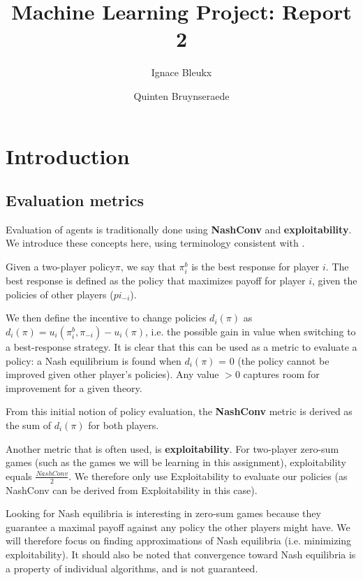 \documentclass[10pt,a4paper]{article}
\title{Machine Learning Project: Report 2}
\author{Ignace Bleukx \and Quinten Bruynseraede}
\begin{document}
\maketitle
\section{Introduction}
\subsection{Evaluation metrics}
Evaluation of agents is traditionally done using \textbf{NashConv} and \textbf{exploitability}. We introduce these concepts here, using terminology consistent with \citeauthor{lanctot2019openspiel} \citep{lanctot2019openspiel}.

Given a two-player policy$\pi$, we say that $\pi^{b}_{i}$ is the best response for player $i$. The best response is defined as the policy that maximizes payoff for player $i$, given the policies of other players ($pi_{-i}$). 

We then define the incentive to change policies $d_{i}(\pi)$ as $d_{i}(\pi) = u_{i}(\pi^{b}_{i},\pi_{-i}) - u_{i}(\pi)$, i.e. the possible gain in value when switching to a best-response strategy. It is clear that this can be used as a metric to evaluate a policy: a Nash equilibrium is found when $d_{i}(\pi)$ = 0 (the policy cannot be improved given other player's policies). Any value $>0$ captures room for improvement for a given theory. 

From this initial notion of policy evaluation, the \textbf{NashConv} metric is derived as the sum of $d_{i}(\pi)$ for both players.

Another metric that is often used, is \textbf{exploitability}. For two-player zero-sum games (such as the games we will be learning in this assignment), exploitability equals $\frac{NashConv}{2}$. We therefore only use Exploitability to evaluate our policies (as NashConv can be derived from Exploitability in this case).

Looking for Nash equilibria is interesting in zero-sum games because they guarantee a maximal payoff against any policy the other players might have. We will therefore focus on finding approximations of Nash equilibria (i.e. minimizing exploitability). It should also be noted that convergence toward Nash equilibria is a property of individual algorithms, and is not guaranteed.
\end{document}

